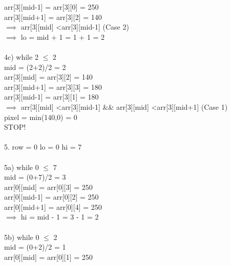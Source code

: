 \documentclass[10pt]{article}
\begin{document}
\begin{multicols*}{2}
        arr[3][mid-1] = arr[3][0] = 250\\

        arr[3][mid+1] = arr[3][2] = 140\\
        
        $\implies$ arr[3][mid] \textless arr[3][mid-1] (Case 2)\\
        
        $\implies$ lo = mid + 1 = 1 + 1 = 2\\\\4c) while 2 $\leq$ 2\\
    
        mid = (2+2)/2 = 2\\

        arr[3][mid] = arr[3][2] = 140\\

        arr[3][mid+1] = arr[3][3] = 180\\
        
        arr[3][mid-1] = arr[3][1] = 180\\
        
        $\implies$ arr[3][mid] \textless arr[3][mid-1] \&\& arr[3][mid] \textless arr[3][mid+1] (Case 1)\\
    
        pixel = min(140,0) = 0\\ 
        
        STOP!\\\\5. row = 0
   lo = 0
   hi = 7\\\\5a) while 0 $\leq$ 7\\

        mid = (0+7)/2 = 3\\

        arr[0][mid] = arr[0][3] = 250\\

        arr[0][mid-1] = arr[0][2] = 250\\

        arr[0][mid+1] = arr[0][4] = 250\\
        
        $\implies$ hi = mid - 1 = 3 - 1 = 2\\\\5b) while 0 $\leq$ 2\\
    
        mid = (0+2)/2 = 1\\

        arr[0][mid] = arr[0][1] = 250\\


\end{multicols*}
\end{document}
